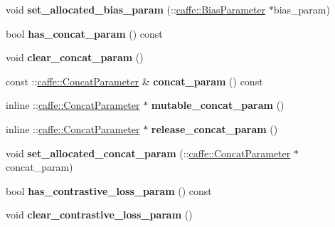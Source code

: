 \begin{DoxyCompactItemize}
void {\bfseries set\+\_\+allocated\+\_\+bias\+\_\+param} (\+::\mbox{\hyperlink{classcaffe_1_1_bias_parameter}{caffe\+::\+Bias\+Parameter}} $\ast$bias\+\_\+param)
\item 
\mbox{\label{classcaffe_1_1_layer_parameter_ad504a9b9a954f6927e33259a4f5eba72}} 
bool {\bfseries has\+\_\+concat\+\_\+param} () const
\item 
\mbox{\label{classcaffe_1_1_layer_parameter_ab1dc0a77883e4e2ad6d0760137b3bcef}} 
void {\bfseries clear\+\_\+concat\+\_\+param} ()
\item 
\mbox{\label{classcaffe_1_1_layer_parameter_a7ce6f6418b4d95e5f1143812e00664a0}} 
const \+::\mbox{\hyperlink{classcaffe_1_1_concat_parameter}{caffe\+::\+Concat\+Parameter}} \& {\bfseries concat\+\_\+param} () const
\item 
\mbox{\label{classcaffe_1_1_layer_parameter_a71b3d19bcec399c3b8e9d7e4da7c30a6}} 
inline \+::\mbox{\hyperlink{classcaffe_1_1_concat_parameter}{caffe\+::\+Concat\+Parameter}} $\ast$ {\bfseries mutable\+\_\+concat\+\_\+param} ()
\item 
\mbox{\label{classcaffe_1_1_layer_parameter_ac1e32343fe93bb72a67d6e882f8242c4}} 
inline \+::\mbox{\hyperlink{classcaffe_1_1_concat_parameter}{caffe\+::\+Concat\+Parameter}} $\ast$ {\bfseries release\+\_\+concat\+\_\+param} ()
\item 
\mbox{\label{classcaffe_1_1_layer_parameter_ae45902735e24908d79a909e6237d33e2}} 
void {\bfseries set\+\_\+allocated\+\_\+concat\+\_\+param} (\+::\mbox{\hyperlink{classcaffe_1_1_concat_parameter}{caffe\+::\+Concat\+Parameter}} $\ast$concat\+\_\+param)
\item 
\mbox{\label{classcaffe_1_1_layer_parameter_a03f2544f97a480bd2f960a0392d34314}} 
bool {\bfseries has\+\_\+contrastive\+\_\+loss\+\_\+param} () const
\item 
\mbox{\label{classcaffe_1_1_layer_parameter_a36ede777e8eb71e2740c4719ac544289}} 
void {\bfseries clear\+\_\+contrastive\+\_\+loss\+\_\+param} ()

\end{DoxyCompactItemize}
